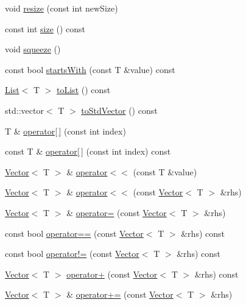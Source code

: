 \begin{DoxyCompactItemize}
\item 
void \hyperlink{classprism_1_1_vector_a13675c55c77df670075a9f80057d1d2e}{resize} (const int new\+Size)
\item 
const int \hyperlink{classprism_1_1_vector_ac6ff3296683e76da61d48bcc15e4f175}{size} () const 
\item 
void \hyperlink{classprism_1_1_vector_ab2491ac6ff73d372ed8f080adef78208}{squeeze} ()
\item 
const bool \hyperlink{classprism_1_1_vector_a7562a7e62555ee5cc35b309799cbfb05}{starts\+With} (const T \&value) const 
\item 
\hyperlink{classprism_1_1_list}{List}$<$ T $>$ \hyperlink{classprism_1_1_vector_a129dfc6925b70bb736a4539bcb323de9}{to\+List} () const 
\item 
std\+::vector$<$ T $>$ \hyperlink{classprism_1_1_vector_ae84be49ceac4011b35dd81218324b7df}{to\+Std\+Vector} () const 
\item 
T \& \hyperlink{classprism_1_1_vector_a98144a18b30f486f276bd7420db4f012}{operator\mbox{[}$\,$\mbox{]}} (const int index)
\item 
const T \& \hyperlink{classprism_1_1_vector_aec9d5e00c9127674735e321217fe3728}{operator\mbox{[}$\,$\mbox{]}} (const int index) const 
\item 
\hyperlink{classprism_1_1_vector}{Vector}$<$ T $>$ \& \hyperlink{classprism_1_1_vector_a687da3b48a2087e6e07fd5219389adb3}{operator$<$$<$} (const T \&value)
\item 
\hyperlink{classprism_1_1_vector}{Vector}$<$ T $>$ \& \hyperlink{classprism_1_1_vector_a63456dd4a36f843522f6312f0c3032e7}{operator$<$$<$} (const \hyperlink{classprism_1_1_vector}{Vector}$<$ T $>$ \&rhs)
\item 
\hyperlink{classprism_1_1_vector}{Vector}$<$ T $>$ \& \hyperlink{classprism_1_1_vector_a8e248700c87a2176c675c91d4f6a4390}{operator=} (const \hyperlink{classprism_1_1_vector}{Vector}$<$ T $>$ \&rhs)
\item 
const bool \hyperlink{classprism_1_1_vector_aedbb9a32bb25fe4bc5907fa498fe6534}{operator==} (const \hyperlink{classprism_1_1_vector}{Vector}$<$ T $>$ \&rhs) const 
\item 
const bool \hyperlink{classprism_1_1_vector_a7f3b55afc7268eba0f06a16f54b66b0c}{operator!=} (const \hyperlink{classprism_1_1_vector}{Vector}$<$ T $>$ \&rhs) const 
\item 
\hyperlink{classprism_1_1_vector}{Vector}$<$ T $>$ \hyperlink{classprism_1_1_vector_a9275846b38b6ce971d7d7114bca5acc2}{operator+} (const \hyperlink{classprism_1_1_vector}{Vector}$<$ T $>$ \&rhs) const 
\item 
\hyperlink{classprism_1_1_vector}{Vector}$<$ T $>$ \& \hyperlink{classprism_1_1_vector_a094f14b6f6f219dda41b0b7879d9b6b5}{operator+=} (const \hyperlink{classprism_1_1_vector}{Vector}$<$ T $>$ \&rhs)
\end{DoxyCompactItemize}
